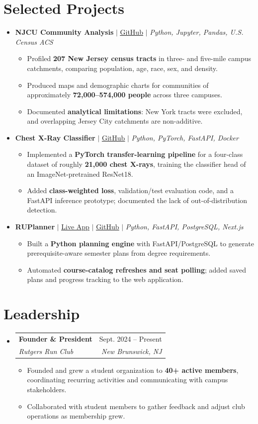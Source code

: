 \documentclass[letterpaper,10pt]{article}
\makeatletter
\newcommand{\resumeItem}[1]{\item\small{#1}}
\newcommand{\resumeSubheading}[4]{
  \vspace{1pt}\item
  \begin{tabular*}{0.97\textwidth}[t]{l@{\extracolsep{\fill}}r}
    \textbf{#1} & #2 \\
    \textit{\small #3} & \textit{\small #4} \\
  \end{tabular*}\vspace{-3pt}
}
\newcommand{\resumeProjectHeading}[1]{\vspace{3pt}\item\small{#1}\vspace{0pt}}
\newcommand{\resumeSubHeadingListStart}{\begin{itemize}[leftmargin=0.15in,label={},itemsep=0pt,topsep=0pt]}
\newcommand{\resumeSubHeadingListEnd}{\end{itemize}}
\newcommand{\resumeItemListStart}{\begin{itemize}[leftmargin=0.15in,label=\textbullet,itemsep=-2pt,topsep=0pt]}
\newcommand{\resumeItemListEnd}{\end{itemize}\vspace{0pt}}
\makeatother
\begin{document}
\section{Selected Projects}
\resumeSubHeadingListStart
  \resumeProjectHeading{\textbf{NJCU Community Analysis} $|$ \href{https://github.com/ameer-rah/njcu-community-analysis-internal}{\underline{GitHub}} $|$ \emph{Python, Jupyter, Pandas, U.S. Census ACS}}
    \resumeItemListStart
      \resumeItem{Profiled \textbf{207 New Jersey census tracts} in three- and five-mile campus catchments, comparing population, age, race, sex, and density.}
      \resumeItem{Produced maps and demographic charts for communities of approximately \textbf{72,000--574,000 people} across three campuses.}
      \resumeItem{Documented \textbf{analytical limitations}: New York tracts were excluded, and overlapping Jersey City catchments are non-additive.}
    \resumeItemListEnd
  \resumeProjectHeading{\textbf{Chest X-Ray Classifier} $|$ \href{https://github.com/ameer-rah/chest-xray-classifier}{\underline{GitHub}} $|$ \emph{Python, PyTorch, FastAPI, Docker}}
    \resumeItemListStart
      \resumeItem{Implemented a \textbf{PyTorch transfer-learning pipeline} for a four-class dataset of roughly \textbf{21,000 chest X-rays}, training the classifier head of an ImageNet-pretrained ResNet18.}
      \resumeItem{Added \textbf{class-weighted loss}, validation/test evaluation code, and a FastAPI inference prototype; documented the lack of out-of-distribution detection.}
    \resumeItemListEnd
  \resumeProjectHeading{\textbf{RUPlanner} $|$ \href{https://ruplanner.app/}{\underline{Live App}} $|$ \href{https://github.com/ameer-rah/RUPlanner}{\underline{GitHub}} $|$ \emph{Python, FastAPI, PostgreSQL, Next.js}}
    \resumeItemListStart
      \resumeItem{Built a \textbf{Python planning engine} with FastAPI/PostgreSQL to generate prerequisite-aware semester plans from degree requirements.}
      \resumeItem{Automated \textbf{course-catalog refreshes and seat polling}; added saved plans and progress tracking to the web application.}
    \resumeItemListEnd
\resumeSubHeadingListEnd

\section{Leadership}
\resumeSubHeadingListStart
  \resumeSubheading{Founder \& President}{Sept. 2024 -- Present}
    {Rutgers Run Club}{New Brunswick, NJ}
    \resumeItemListStart
      \resumeItem{Founded and grew a student organization to \textbf{40+ active members}, coordinating recurring activities and communicating with campus stakeholders.}
      \resumeItem{Collaborated with student members to gather feedback and adjust club operations as membership grew.}
    \resumeItemListEnd
\resumeSubHeadingListEnd
\end{document}

